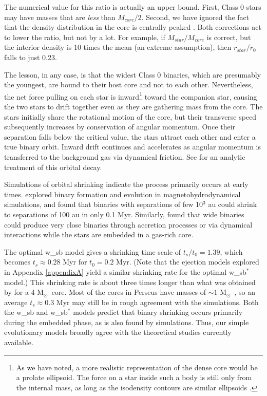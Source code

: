 \documentclass[usenatbib,a4paper]{mnras}
\newcommand{\Msun}{\mbox{M$_{\odot}$}}
\newcommand{\tOI}{\mbox{$t_{0}$}} %
\begin{document}
The numerical value for this ratio is actually an upper bound.   First, Class 0 stars may have masses that are \emph{less} than $M_{core}/2$.  Second, we have ignored the fact that the density distribution in the core is centrally peaked \citep[see, e.g.,][]{Jorgensen07}. Both corrections act to lower the ratio, but not by a lot. For example, if $M_{star}/M_{core}$ is correct, but the interior density is 10 times the mean (an extreme assumption), then $r_{star}/r_0$ falls to just 0.23.

The lesson, in any case, is that the widest Class 0 binaries, which are presumably the youngest, are bound to their host core and not to each other.  Nevertheless, the net force pulling on each star is inward\footnote{As we have noted, a more realistic representation of the dense core would be a prolate ellipsoid. The force on a star inside such a body is still only from the internal mass, as long as the isodensity contours are similar ellipsoids \citep{Chandrasekhar69}.} toward the companion star, causing the two stars to drift together even as they are gathering mass from the core. The stars initially share the rotational motion of the core, but their transverse speed subsequently increases by conservation of angular momentum.  Once their separation falls below the critical value, the stars attract each other and enter a true binary orbit.  Inward drift continues and accelerates as angular momentum is transferred to the background gas via dynamical friction.   See \citet{Stahler10} for an analytic treatment of this orbital decay.  

Simulations of orbital shrinking indicate the process primarily occurs at early times.  \citet{Offner16} explored binary formation and evolution in magnetohydrodynamical simulations, and found that binaries with separations of few 10$^3$ au could shrink to separations of 100 au in only 0.1 Myr.    Similarly, \citet{Bate02} found that wide binaries could produce very close binaries through accretion processes or via dynamical interactions while the stars are embedded in a gas-rich core. 

The optimal w\_sb model gives a shrinking time scale of $t_s/\tOI = 1.39$, which becomes $t_s \approx 0.28$ Myr for $\tOI = 0.2$ Myr.  (Note that the ejection models explored in Appendix \ref{appendixA} yield a similar shrinking rate for the optimal w\_sb$^{\ast}$ model.)  This shrinking rate is about three times longer than what was obtained by \citet{Offner16} for a 4 \Msun\ core.   Most of the cores in Perseus have masses of $\sim 1$ \Msun\ \citep{Sadavoy10}, so an average $t_s \approx 0.3$ Myr may still be in rough agreement with the simulations.    Both the w\_sb and w\_sb$^{\ast}$ models predict that binary shrinking occurs primarily during the embedded phase, as is also found by simulations.  Thus, our simple evolutionary models broadly agree with the theoretical studies currently available.  
\end{document}

